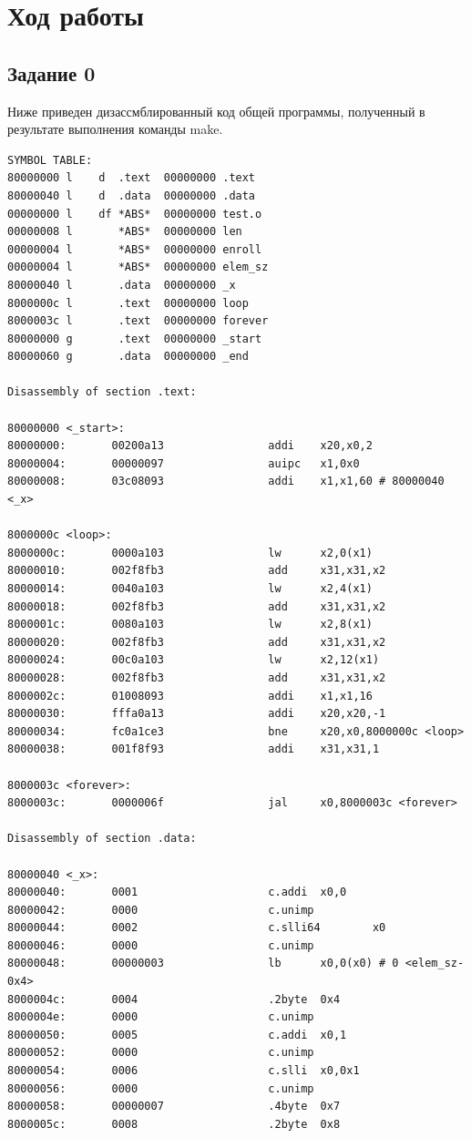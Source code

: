 \chapter{Ход работы}

\section{Задание 0}

Ниже приведен дизассмблированный код общей программы, получен\-ный 
в результате выполнения команды make.

\begin{lstlisting}[label={common_asm}, language={RISC-V}, caption=Дизассемблированный код общей программы]
SYMBOL TABLE:
80000000 l    d  .text  00000000 .text
80000040 l    d  .data  00000000 .data
00000000 l    df *ABS*  00000000 test.o
00000008 l       *ABS*  00000000 len
00000004 l       *ABS*  00000000 enroll
00000004 l       *ABS*  00000000 elem_sz
80000040 l       .data  00000000 _x
8000000c l       .text  00000000 loop
8000003c l       .text  00000000 forever
80000000 g       .text  00000000 _start
80000060 g       .data  00000000 _end

Disassembly of section .text:

80000000 <_start>:
80000000:       00200a13                addi    x20,x0,2
80000004:       00000097                auipc   x1,0x0
80000008:       03c08093                addi    x1,x1,60 # 80000040 <_x>

8000000c <loop>:
8000000c:       0000a103                lw      x2,0(x1)
80000010:       002f8fb3                add     x31,x31,x2
80000014:       0040a103                lw      x2,4(x1)
80000018:       002f8fb3                add     x31,x31,x2
8000001c:       0080a103                lw      x2,8(x1)
80000020:       002f8fb3                add     x31,x31,x2
80000024:       00c0a103                lw      x2,12(x1)
80000028:       002f8fb3                add     x31,x31,x2
8000002c:       01008093                addi    x1,x1,16
80000030:       fffa0a13                addi    x20,x20,-1
80000034:       fc0a1ce3                bne     x20,x0,8000000c <loop>
80000038:       001f8f93                addi    x31,x31,1

8000003c <forever>:
8000003c:       0000006f                jal     x0,8000003c <forever>

Disassembly of section .data:

80000040 <_x>:
80000040:       0001                    c.addi  x0,0
80000042:       0000                    c.unimp
80000044:       0002                    c.slli64        x0
80000046:       0000                    c.unimp
80000048:       00000003                lb      x0,0(x0) # 0 <elem_sz-0x4>
8000004c:       0004                    .2byte  0x4
8000004e:       0000                    c.unimp
80000050:       0005                    c.addi  x0,1
80000052:       0000                    c.unimp
80000054:       0006                    c.slli  x0,0x1
80000056:       0000                    c.unimp
80000058:       00000007                .4byte  0x7
8000005c:       0008                    .2byte  0x8
\end{lstlisting}

